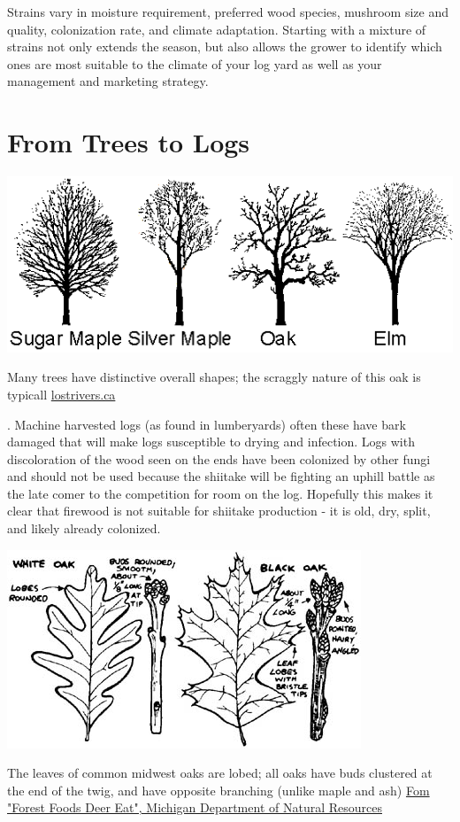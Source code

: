 \documentclass{tufte-handout}
\begin{document}
Strains vary in moisture requirement, preferred wood species, mushroom size and quality, colonization rate, and climate adaptation. 
Starting with a mixture of strains not only extends the season,  but also allows the grower to identify which ones are most
suitable to the climate of your log yard as well as your management
and marketing strategy.

\section{From Trees to Logs}

\begin{marginfigure}
\includegraphics{tree-forms}
\caption{Many trees have distinctive overall shapes; the scraggly nature of this oak is typicall \href{http://www.lostrivers.ca/content/points/treeswinter.html}{lostrivers.ca}}
\end{marginfigure}

. 
Machine harvested logs (as found in lumberyards) often these have bark damaged that will make logs susceptible to drying and infection. 
Logs with discoloration of the wood seen on the ends have been colonized by other fungi and should not be used because the shiitake will be fighting an uphill battle as the late comer to the competition for room on the log.
Hopefully this makes it clear that firewood is not suitable for shiitake production - it is old, dry, split, and likely already colonized.

\begin{marginfigure}
\includegraphics{oak-leaves-twigs}
\caption{The leaves of common midwest oaks are lobed; all oaks have buds clustered at the end of the twig, and have opposite branching (unlike maple and ash)  
\href{http://www.michigan.gov/dnr/0,4570,7-153-10370_12148-61306--,00.html}{Fom "Forest Foods Deer Eat", Michigan Department of Natural Resources}
}
\end{marginfigure}
\end{document}
